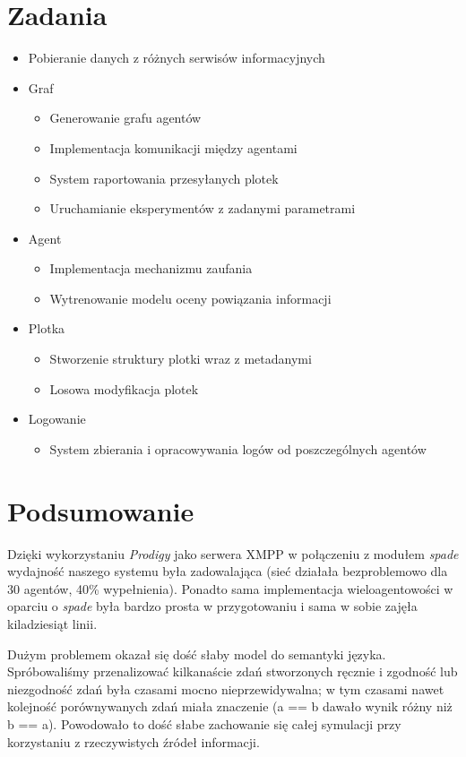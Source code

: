 \documentclass{article}
\begin{document}
	\section{Zadania}
	\begin{itemize}
	\item Pobieranie danych z różnych serwisów informacyjnych
	\item Graf
		\begin{itemize}
		\item Generowanie grafu agentów
		\item Implementacja komunikacji między agentami
		\item System raportowania przesyłanych plotek
		\item Uruchamianie eksperymentów z zadanymi parametrami
		\end{itemize}
	\item Agent
		\begin{itemize}
		\item Implementacja mechanizmu zaufania
		\item Wytrenowanie modelu oceny powiązania informacji
		\end{itemize}
	\item Plotka
		\begin{itemize}
		\item Stworzenie struktury plotki wraz z metadanymi
		\item Losowa modyfikacja plotek
		\end{itemize}
	\item Logowanie
		\begin{itemize}
		\item System zbierania i opracowywania logów od poszczególnych agentów
		\end{itemize}
	\end{itemize}
	
	\section{Podsumowanie}
	Dzięki wykorzystaniu \textit{Prodigy} jako serwera XMPP w połączeniu z modułem \textit{spade} wydajność naszego systemu była zadowalająca (sieć działała bezproblemowo dla 30 agentów, 40\% wypełnienia). Ponadto sama implementacja wieloagentowości w oparciu o \textit{spade} była bardzo prosta w przygotowaniu i sama w sobie zajęła kiladziesiąt linii.

	Dużym problemem okazał się dość słaby model do semantyki języka. Spróbowaliśmy przenalizować kilkanaście zdań stworzonych ręcznie i zgodność lub niezgodność zdań była czasami mocno nieprzewidywalna; w tym czasami nawet kolejność porównywanych zdań miała znaczenie (a == b dawało wynik różny niż b == a). Powodowało to dość słabe zachowanie się całej symulacji przy korzystaniu z rzeczywistych źródeł informacji.
\end{document}

